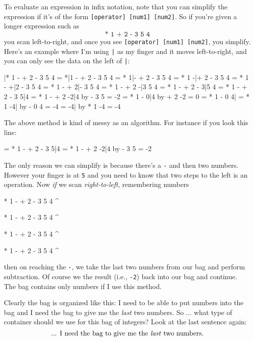 To evaluate an expression in infix notation, 
note that you can simplify the expression if it's of the form
\verb![operator] [num1] [num2]!.
So if you're given a longer expression such as
\[
\texttt{* 1 + 2 - 3 5 4}
\]
you scan left-to-right, and once you see \verb![operator] [num1] [num2]!,
you simplify.
Here's an example where I'm using \verb!|! as my finger
and it moves left-to-right, and you can only see the data on the 
left of \verb!|!:
\begin{console}
 |* 1 - + 2 - 3 5 4
= *|1 - + 2 - 3 5 4
= * 1|- + 2 - 3 5 4
= * 1 -|+ 2 - 3 5 4
= * 1 - +|2 - 3 5 4
= * 1 - + 2|- 3 5 4
= * 1 - + 2 -|3 5 4
= * 1 - + 2 - 3|5 4
= * 1 - + 2 - 3 5|4
= * 1 - + 2 -2|4       by - 3 5 = -2
= * 1 - 0|4            by + 2 -2 = 0
= * 1 - 0 4|
= * 1 -4|              by - 0 4 = -4
= -4|                  by * 1 -4 = -4
\end{console}
The above method is kind of messy as an algorithm.
For instance if you look this line:
\begin{console}
= * 1 - + 2 - 3 5|4
= * 1 - + 2 -2|4       by - 3 5 = -2
\end{console}
The only reason we can simplify is because there's a \texttt{-}
and then two numbers.
However your finger is at \texttt{5} and you need to
know that two steps to the left is an operation.
Now \textit{if} we scan \textit{right-to-left},
remembering numbers
\begin{console}
  * 1 - + 2 - 3 5 4
                  ^
            
  * 1 - + 2 - 3 5 4
                ^
                
  * 1 - + 2 - 3 5 4
              ^
                            
  * 1 - + 2 - 3 5 4
            ^
\end{console}
then on reaching the \texttt{-}, we take the last two numbers
from our bag and perform subtraction.
Of course we the result (i.e., \texttt{-2}) back into our bag
and continue.
The bag contains only numbers if I use this method.

Clearly the bag is organized like this:
I need to be able to put numbers into the bag
and I need the bag to give me the \textit{last} two numbers.
So ... what type of container should we use for this bag of integers?
Look at the last sentence again:
\[
\text{... I need the bag to give me the \textit{last} two numbers.}
\]

